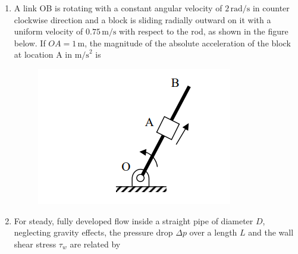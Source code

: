 \documentclass[journal]{IEEEtran}
\begin{document}
\begin{enumerate}[leftmargin=0pt]
\item A link OB is rotating with a constant angular velocity of $2\,\text{rad/s}$ in counter clockwise direction and a block is sliding radially outward on it with a uniform velocity of $0.75\,\text{m/s}$ with respect to the rod, as shown in the figure below. If $OA = 1\,\text{m}$, the magnitude of the absolute acceleration of the block at location A in $\text{m/s}^2$ is
\begin{figure}[h]
    \centering
    \includegraphics[width=0.5\columnwidth]{Figs/image (15).png}
    \caption*{}
    \label{fig:q6}
\end{figure}
\begin{enumerate}
\end{enumerate}

\hfill{}

\item For steady, fully developed flow inside a straight pipe of diameter $D$, neglecting gravity effects, the pressure drop $\Delta p$ over a length $L$ and the wall shear stress $\tau_w$ are related by
\begin{enumerate}
\end{enumerate}

\hfill{}


\end{enumerate}
\end{document}
